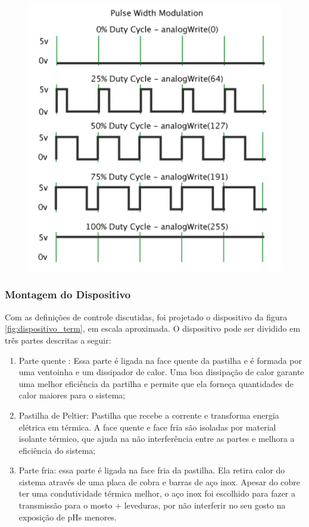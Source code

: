 \begin{figure}[H]
    \centering
    \includegraphics[scale=0.30]{figuras/implementacao/hardware/pwm.png}
    \label{fig:pwm}
\end{figure}


\subsubsection{Montagem do Dispositivo}

Com as definições de controle discutidas, foi projetado o dispositivo da figura \ref{fig:dispositivo_term}, em escala aproximada. O dispositivo pode ser dividido em três partes descritas a seguir:

\begin{enumerate}
    \item Parte quente : Essa parte é ligada na face quente da pastilha e é formada por uma ventoinha e um dissipador de calor. Uma boa dissipação de calor garante uma melhor eficiência da partilha e permite que ela forneça quantidades de calor maiores para o sistema;
    \item Pastilha de Peltier: Pastilha que recebe a corrente e transforma energia elétrica em térmica. A face quente e face fria são isoladas por material isolante térmico, que ajuda na não interferência entre as partes e melhora a eficiência do sistema;
    \item Parte fria: essa parte é ligada na face fria da pastilha. Ela retira calor do sistema através de uma placa de cobra e barras de aço inox. Apesar do cobre ter uma condutividade térmica melhor, o aço inox foi escolhido para fazer a transmissão para o mosto + leveduras, por não interferir no seu gosto na exposição de pHs menores. 
\end{enumerate}


